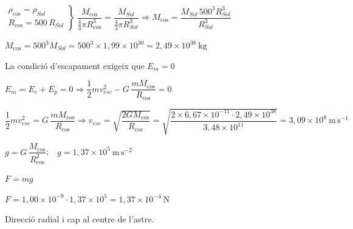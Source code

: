 \begin{solapartat}
 $\left.\begin{array}{l} \rho_\mathrm{cos} = \rho_\mathit{Sol} \\ R_\mathrm{cos} = 500\,R_\mathit{Sol} \end{array}\right\}\ \dfrac{M_\mathrm{cos}}{\frac{4}{3}\pi R_\mathrm{cos}^3} = \dfrac{M_\mathit{Sol}}{\frac{4}{3}\pi R_\mathit{Sol}^3} \Rightarrow M_\mathrm{cos} = \dfrac{M_\mathit{Sol}\,500^3 R_\mathit{Sol}^3}{R_\mathit{Sol}^3}$

 $M_\mathrm{cos} = 500^3 M_\mathit{Sol} = 500^3\times 1,99\times 10^{30} = 2,49\times 10^{38}\ \mathrm{kg}$

 La condició d'escapament exigeix que $E_m = 0$

 $E_m = E_c + E_p = 0 \Rightarrow \dfrac{1}{2}mv_\mathit{esc}^2 - G\,\dfrac{mM_\mathrm{cos}}{R_\mathrm{cos}} = 0$

 $\dfrac{1}{2}mv_\mathit{esc}^2 = G\,\dfrac{mM_\mathrm{cos}}{R_\mathrm{cos}} \Rightarrow v_\mathit{esc} = \sqrt{\dfrac{2GM_\mathrm{cos}}{R_\mathrm{cos}}} = \sqrt{\dfrac{2\times 6,67\times 10^{-11}\cdot 2,49\times 10^{38}}{3,48\times 10^{11}}} = 3,09\times 10^{8}\ \mathrm{m\,s^{-1}}$
\end{solapartat}

\begin{solapartat}
 $g = G\,\dfrac{M_\mathrm{cos}}{R_\mathrm{cos}^2}$;\ \ $g = 1,37\times 10^{5}\ \mathrm{m\,s^{-2}}$ 

 $F = mg$

 $F = 1,00\times 10^{-9}\cdot 1,37\times 10^{5} = 1,37\times 10^{-4}\ \mathrm{N}$

Direcció radial i cap al centre de l'astre.
\end{solapartat}
